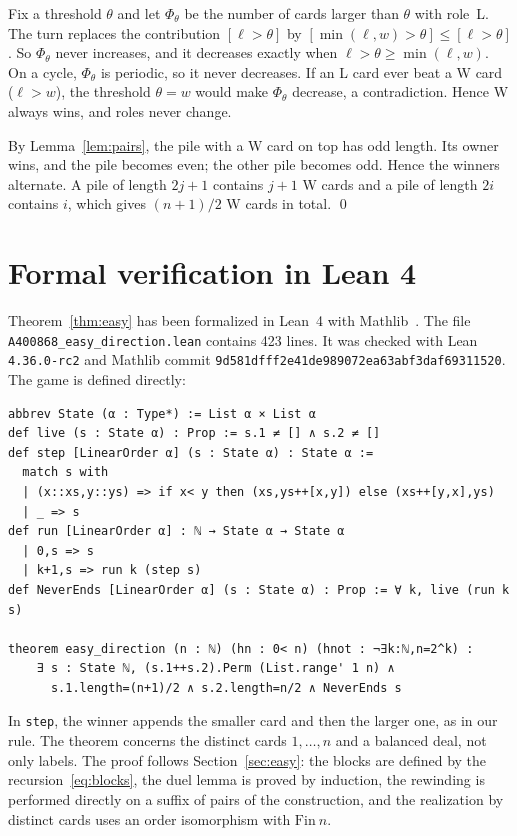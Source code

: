 \documentclass[11pt,a4paper]{amsart}
\theoremstyle{definition}
\theoremstyle{remark}
\begin{document}
Fix a threshold $\theta$ and let $\Phi_\theta$ be the number of cards larger than $\theta$ with role~L. The turn replaces the contribution $[\ell>\theta]$ by $[\min(\ell,w)>\theta]\le[\ell>\theta]$. So $\Phi_\theta$ never increases, and it decreases exactly when $\ell>\theta\ge\min(\ell,w)$. On a cycle, $\Phi_\theta$ is periodic, so it never decreases. If an L card ever beat a W card ($\ell>w$), the threshold $\theta=w$ would make $\Phi_\theta$ decrease, a contradiction. Hence W always wins, and roles never change.

By Lemma~\ref{lem:pairs}, the pile with a W card on top has odd length. Its owner wins, and the pile becomes even; the other pile becomes odd. Hence the winners alternate. A pile of length $2j+1$ contains $j+1$ W cards and a pile of length $2i$ contains $i$, which gives $(n+1)/2$ W cards in total. \qed

\section{Formal verification in Lean 4}\label{sec:lean}

Theorem~\ref{thm:easy} has been formalized in Lean~4 with Mathlib~\cite{lean4,mathlib}. The file \texttt{A400868\_easy\_direction.lean} contains 423 lines. It was checked with Lean \texttt{4.36.0-rc2} and Mathlib commit \texttt{9d581dff\allowbreak f2e41de989072ea63abf3daf69311520}. The game is defined directly:
\begin{lstlisting}
abbrev State (α : Type*) := List α × List α
def live (s : State α) : Prop := s.1 ≠ [] ∧ s.2 ≠ []
def step [LinearOrder α] (s : State α) : State α :=
  match s with
  | (x::xs,y::ys) => if x< y then (xs,ys++[x,y]) else (xs++[y,x],ys)
  | _ => s
def run [LinearOrder α] : ℕ → State α → State α
  | 0,s => s
  | k+1,s => run k (step s)
def NeverEnds [LinearOrder α] (s : State α) : Prop := ∀ k, live (run k s)

theorem easy_direction (n : ℕ) (hn : 0< n) (hnot : ¬∃k:ℕ,n=2^k) :
    ∃ s : State ℕ, (s.1++s.2).Perm (List.range' 1 n) ∧
      s.1.length=(n+1)/2 ∧ s.2.length=n/2 ∧ NeverEnds s
\end{lstlisting}
In \texttt{step}, the winner appends the smaller card and then the larger one, as in our rule. The theorem concerns the distinct cards $1,\dots,n$ and a balanced deal, not only labels. The proof follows Section~\ref{sec:easy}: the blocks are defined by the recursion~\eqref{eq:blocks}, the duel lemma is proved by induction, the rewinding is performed directly on a suffix of pairs of the construction, and the realization by distinct cards uses an order isomorphism with $\mathrm{Fin}\ n$.
\end{document}
